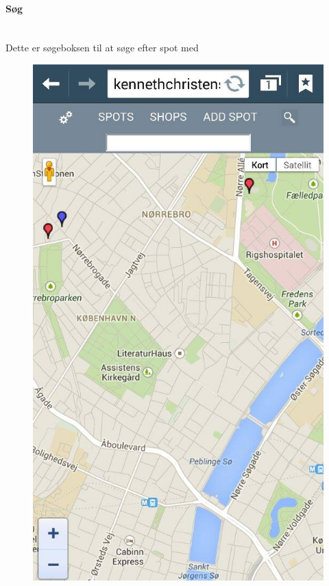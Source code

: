 \documentclass[12pt]{article}
\begin{document}
\newpage
\paragraph{Søg}\mbox{}\\
Dette er søgeboksen til at søge efter spot med\\
\begin{figure}[h]
\includegraphics[scale = 0.3]{search}
\end{figure}
\end{document}
